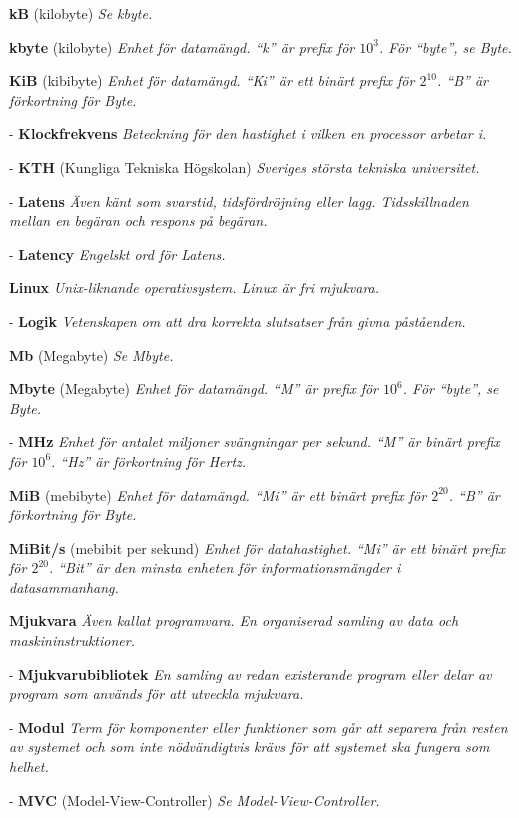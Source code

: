 \documentclass[a4paper, twoside, 11pt, titlepage]{article}
\begin{document}
\textbf{kB} (kilobyte) \emph{Se kbyte.}

\textbf{kbyte} (kilobyte) \emph{Enhet för datamängd. ``k'' är prefix för $10^{3}$. För ``byte'', se Byte.}

\textbf{KiB} (kibibyte) \emph{Enhet för datamängd. ``Ki'' är ett binärt prefix för $2^{10}$. ``B'' är förkortning för Byte.}

- \textbf{Klockfrekvens} \emph{Beteckning för den hastighet i vilken en processor arbetar i.}

- \textbf{KTH} (Kungliga Tekniska Högskolan) \emph{Sveriges största tekniska universitet.}

- \textbf{Latens} \emph{Även känt som svarstid, tidsfördröjning eller lagg. Tidsskillnaden mellan en begäran och respons på begäran.}

- \textbf{Latency} \emph{Engelskt ord för Latens.}

\textbf{Linux} \emph{Unix-liknande operativsystem. Linux är fri mjukvara.}

- \textbf{Logik} \emph{Vetenskapen om att dra korrekta slutsatser från givna påståenden.}

\textbf{Mb} (Megabyte) \emph{Se Mbyte.}

\textbf{Mbyte} (Megabyte) \emph{Enhet för datamängd. ``M'' är prefix för $10^{6}$. För ``byte'', se Byte.}

- \textbf{MHz} \emph{Enhet för antalet miljoner svängningar per sekund. ``M'' är binärt prefix för $10^{6}$. ``Hz'' är förkortning för Hertz.}

\textbf{MiB} (mebibyte) \emph{Enhet för datamängd. ``Mi'' är ett binärt prefix för $2^{20}$. ``B'' är förkortning för Byte.}

\textbf{MiBit/s} (mebibit per sekund) \emph{Enhet för datahastighet. ``Mi'' är ett binärt prefix för $2^{20}$. ``Bit'' är den minsta enheten för informationsmängder i datasammanhang.}

\textbf{Mjukvara} \emph{Även kallat programvara. En organiserad samling av data och maskininstruktioner.}

- \textbf{Mjukvarubibliotek} \emph{En samling av redan existerande program eller delar av program som används för att utveckla mjukvara.}

- \textbf{Modul} \emph{Term för komponenter eller funktioner som går att separera från resten av systemet och som inte nödvändigtvis krävs för att systemet ska fungera som helhet.}

- \textbf{MVC} (Model-View-Controller) \emph{Se Model-View-Controller.}
\end{document}
